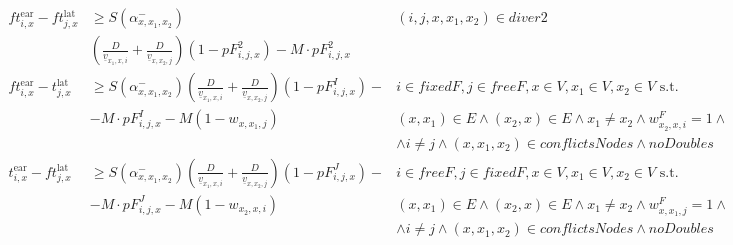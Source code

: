 \documentclass[../thesis.tex]{subfiles}
\begin{document}
{\begin{align}
ft^\text{ear}_{i,x}- ft^\text{lat}_{j,x}&\geq S(\alpha^-_{x,x_1,x_2})&
(i,j,x,x_1,x_2)\in diver2
\nonumber\\
&(\frac D {\underline v_{x_1,x,i}} + \frac D{\underline v_{x,x_2,j}}) (1-pF^2_{i,j,x}) -M\cdot pF^2_{i,j,x}\\
ft^\text{ear}_{i,x}- t^\text{lat}_{j,x}&\geq S(\alpha^-_{x,x_1,x_2})(\frac D {\underline v_{x_1,x,i}} + \frac D{\underline v_{x,x_2,j}}) (1-pF^I_{i,j,x})-&
i \in fixedF, j\in freeF, x\in V,x_1\in V,x_2\in V\text { s.t. }
\nonumber\\
&  -M\cdot pF^I_{i,j,x} - M(1-w_{x,x_1,j})&
(x,x_1)\in E\land (x_2,x)\in E\land x_1\neq x_2\land w^F_{x_2,x,i}=1\land\nonumber\\
&&\land i\neq j \land (x,x_1,x_2)\in conflictsNodes\land noDoubles\\
t^\text{ear}_{i,x}- ft^\text{lat}_{j,x}&\geq S(\alpha^-_{x,x_1,x_2}) (\frac D {\underline v_{x_1,x,i}} + \frac D{\underline v_{x,x_2,j}}) (1-pF^J_{i,j,x})-&
i \in freeF, j\in fixedF, x\in V,x_1\in V,x_2\in V\text { s.t. }
\nonumber\\
 &-M\cdot pF^J_{i,j,x} - M(1-w_{x_2,x,i})&
(x,x_1)\in E\land (x_2,x)\in E\land x_1\neq x_2\land w^F_{x,x_1,j}=1\land\nonumber\\
&&\land i\neq j\land (x,x_1,x_2)\in conflictsNodes\land noDoubles
\end{align}





}
\end{document}

